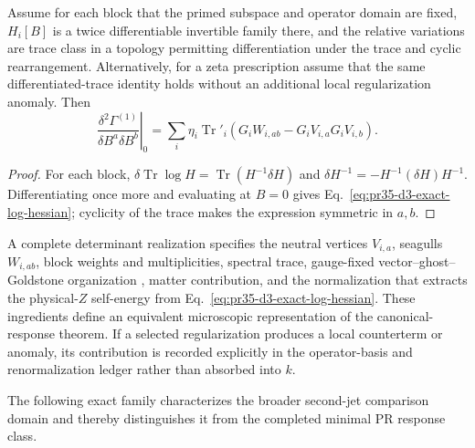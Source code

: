 \begin{lemma}
\label{lem:pr35-d3-log-hessian}
Assume for each block that the primed subspace and operator domain are fixed,$H_i[B]$ is a twice differentiable invertible family there, and the relative variations are trace class in a topology permitting differentiation under the trace and cyclic rearrangement.  Alternatively, for a zeta prescription assume that the same differentiated-trace identity holds without an additional local
regularization anomaly.  Then
\begin{equation}
 \left.\frac{\delta^2\Gamma^{(1)}}
 {\delta B^a\delta B^b}\right|_0
 =\sum_i\eta_i\operatorname{Tr}'_i\!\left(
 G_iW_{i,ab}-G_iV_{i,a}G_iV_{i,b}
 \right).
 \label{eq:pr35-d3-exact-log-hessian}
\end{equation}
\end{lemma}

\begin{proof}
For each block,
$\delta\operatorname{Tr}\log H=\operatorname{Tr}(H^{-1}\delta H)$ and $\delta H^{-1}=-H^{-1}(\delta H)H^{-1}$.  Differentiating once more and evaluating at $B=0$ gives Eq.~\eqref{eq:pr35-d3-exact-log-hessian}; cyclicity of the trace makes the expression symmetric in $a,b$.
\end{proof}

A complete determinant realization specifies the neutral vertices $V_{i,a}$, seagulls $W_{i,ab}$, block weights and multiplicities, spectral trace, gauge-fixed vector--ghost--Goldstone organization
\cite{PeskinSchroeder_1995}, matter contribution, and the normalization that extracts the physical-$Z$ self-energy from Eq.~\eqref{eq:pr35-d3-exact-log-hessian}.  These ingredients define an
equivalent microscopic representation of the canonical-response theorem.  If a selected regularization produces a local counterterm or anomaly, its contribution is recorded explicitly in the operator-basis and renormalization ledger rather than absorbed into $k$.

The following exact family characterizes the broader second-jet comparison domain and thereby distinguishes it from the completed minimal PR response class.

